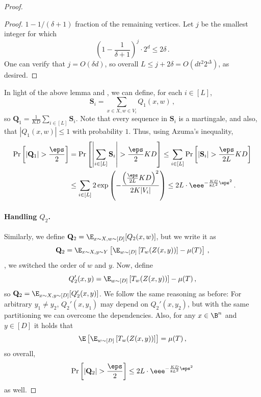 \begin{proof}
\begin{proof}
%
%
$1-1/(\delta+1)$
%
fraction of the remaining vertices.
Let $j$ be the smallest integer for which
\[
\left(1 - \frac{1}{\delta+1} \right)^{j} \cdot 2^{d} \le 2\delta\,.
\]
One can verify that $j = O(\delta d)$, so overall $L \le j+2\delta = O\left(dt^{2}2^{\Delta} \right)$, as desired.
\end{proof}
In light of the above lemma and , we can define, for each $i \in [L]$, 
\[\mathbf{S}_i = \sum_{x\in X,w \in V_i}Q_{1}(x,w)\,,\]
so $\mathbf{Q}_1 = \frac{1}{KD}\sum_{i \in [L]}\mathbf{S}_i$. Note that every sequence in
$\mathbf{S}_i$ is a martingale, and also, that $|Q_{1}(x,w)| \le 1$ with probability $1$. Thus,
using Azuma's inequality,
\begin{align}\label{eq:non-explicit1}
\Pr\left[\left|\mathbf{Q}_1\right| > \frac{\eps}{2}\right] &= \Pr\left[ \left|\sum_{i \in [L]}\mathbf{S}_i\right| > \frac{\eps}{2}KD \right] \le \sum_{i \in [L]}\Pr\left[\left|\mathbf{S}_i\right| > \frac{\eps}{2L}KD\right] \nonumber \\
&\le \sum_{i \in [L]} 2\exp\left( -\frac{\left(\frac{\eps}{2L}KD\right)^2}{2K|V_i|} \right) \le 
2L \cdot \eee^{-\frac{KD}{8L^2}\eps^2}\,.
\end{align}

\paragraph*{Handling $Q_2$.} Similarly, we define
$\mathbf{Q}_2 = \E_{x \sim X,w \sim [D]}[Q_{2}(x,w)]$, but we write it
as 
\[
\mathbf{Q}_2 = \E_{x \sim X,y \sim Y}\left[\E_{w \sim [D]}\left[ T_{w}(Z(x,y)) \right] - \mu(T)\right]\,,
\]
\ie, we switched the order of $w$ and $y$. Now, define
\[
Q_{2}'(x,y) = \E_{w \sim [D]}\left[ T_{w}(Z(x,y)) \right] - \mu(T)\,,
\]
so $\mathbf{Q}_2 = \E_{x \sim X,y \sim [D]}[Q'_{2}(x,y)]$. We follow the same reasoning as before:
For arbitrary $y_1 \neq y_2$, $Q_{2}'(x,y_1)$ may depend on $Q_{2}'(x,y_2)$, but with the same
partitioning we can overcome the dependencies. Also, for any $x \in \B^n$ and $y \in [D]$ 
it holds that
\[
\E\left[ \E_{w \sim [D]}\left[ T_{w}(Z(x,y)) \right] \right] = \mu(T)\,,
\]
so overall,
\begin{equation}\label{eq:non-explicit2}
\Pr\left[\left|\mathbf{Q}_2\right| > \frac{\eps}{2}\right] \le 2L \cdot \eee^{-\frac{KD}{8L^2}\eps^2}
\end{equation}
as well.

%

\end{proof}
